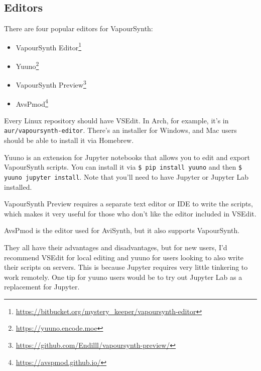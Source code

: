 \documentclass{scrartcl}
\begin{document}
\subsection{Editors}

There are four popular editors for VapourSynth:
\begin{itemize}
\item VapourSynth Editor\footnote{\url{https://bitbucket.org/mystery_keeper/vapoursynth-editor}}
\item Yuuno\footnote{\url{https://yuuno.encode.moe}}
\item VapourSynth Preview\footnote{\url{https://github.com/Endilll/vapoursynth-preview/}}
\item AvsPmod\footnote{\url{https://avspmod.github.io/}}
\end{itemize}

Every Linux repository should have VSEdit.  In Arch, for example, it's in \texttt{aur/vapoursynth-editor}.  There's an installer for Windows, and Mac users should be able to install it via Homebrew.

Yuuno is an extension for Jupyter notebooks that allows you to edit and export VapourSynth scripts.  You can install it via \texttt{\$ pip install yuuno} and then \texttt{\$ yuuno jupyter install}.  Note that you'll need to have Jupyter or Jupyter Lab installed.

VapourSynth Preview requires a separate text editor or IDE to write the scripts, which makes it very useful for those who don't like the editor included in VSEdit.

AvsPmod is the editor used for AviSynth, but it also supports VapourSynth.

They all have their advantages and disadvantages, but for new users, I'd recommend VSEdit for local editing and yuuno for users looking to also write their scripts on servers.  This is because Jupyter requires very little tinkering to work remotely.  One tip for yuuno users would be to try out Jupyter Lab as a replacement for Jupyter.
\end{document}
